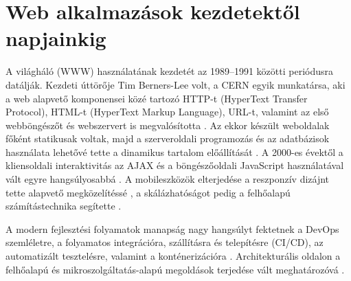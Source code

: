\section{Web alkalmazások kezdetektől napjainkig}
A világháló (WWW) használatának kezdetét az 1989--1991 közötti periódusra datálják. Kezdeti úttörője Tim Berners-Lee volt, a CERN egyik munkatársa, aki a web alapvető komponensei közé tartozó HTTP-t (HyperText Transfer Protocol), HTML-t (HyperText Markup Language), URL-t, valamint az első webböngészőt és webszervert is megvalósította \cite{cern2024www35}. Az ekkor készült weboldalak főként statikusak voltak, majd a szerveroldali programozás és az adatbázisok használata lehetővé tette a dinamikus tartalom előállítását \cite{mdnServerSideIntro}. A 2000-es évektől a kliensoldali interaktivitás az AJAX és a böngészőoldali JavaScript használatával vált egyre hangsúlyosabbá \cite{garrett2005ajax}. A mobileszközök elterjedése a reszponzív dizájnt tette alapvető megközelítéssé \cite{mdnResponsiveDesign}, a skálázhatóságot pedig a felhőalapú számítástechnika segítette \cite{mell2011nistCloud}.

A modern fejlesztési folyamatok manapság nagy hangsúlyt fektetnek a DevOps szemléletre, a folyamatos integrációra, szállításra és telepítésre (CI/CD), az automatizált tesztelésre, valamint a konténerizációra \cite{dora2018accelerate}. Architekturális oldalon a felhőalapú és mikroszolgáltatás-alapú megoldások terjedése vált meghatározóvá \cite{mell2011nistCloud,fowlerLewis2014microservices}.
